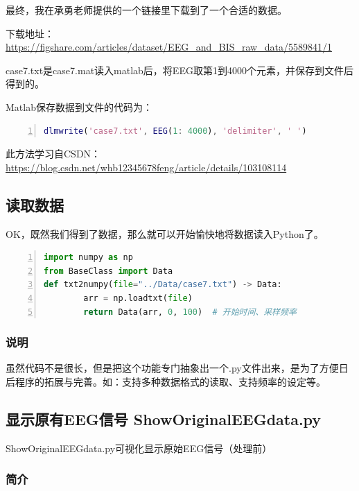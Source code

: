 \documentclass[cs4size,a4paper]{ctexart}
\numberwithin{equation}{section}
\numberwithin{table}{section}
\numberwithin{figure}{section}
\begin{document}
最终，我在承勇老师提供的一个链接里下载到了一个合适的数据。

下载地址：\url{https://figshare.com/articles/dataset/EEG_and_BIS_raw_data/5589841/1
}

case7.txt是case7.mat读入matlab后，将EEG取第1到4000个元素，并保存到文件后得到的。

Matlab保存数据到文件的代码为：

\begin{lstlisting}[language={matlab},
numbers=left,
numberstyle=\tiny\monaco,
basicstyle=\footnotesize\monaco]
dlmwrite('case7.txt', EEG(1: 4000), 'delimiter', ' ')
\end{lstlisting}

此方法学习自CSDN：\url{https://blog.csdn.net/whb12345678feng/article/details/103108114}

\subsection{读取数据}

OK，既然我们得到了数据，那么就可以开始愉快地将数据读入Python了。

\begin{lstlisting}[language={python},
        numbers=left,
        numberstyle=\tiny\monaco,
        basicstyle=\footnotesize\monaco]
import numpy as np
from BaseClass import Data
def txt2numpy(file="../Data/case7.txt") -> Data:
        arr = np.loadtxt(file)
        return Data(arr, 0, 100)  # 开始时间、采样频率
\end{lstlisting}

\subsubsection{说明}

虽然代码不是很长，但是把这个功能专门抽象出一个\colorbox{LetMeFlyGray}{.py}文件出来，是为了方便日后程序的拓展与完善。如：支持多种数据格式的读取、支持频率的设定等。

\subsection{显示原有EEG信号 ShowOriginalEEGdata.py}

\colorbox{LetMeFlyGray}{ShowOriginalEEGdata.py}可视化显示原始EEG信号（处理前）

\subsubsection{简介}
\end{document}
